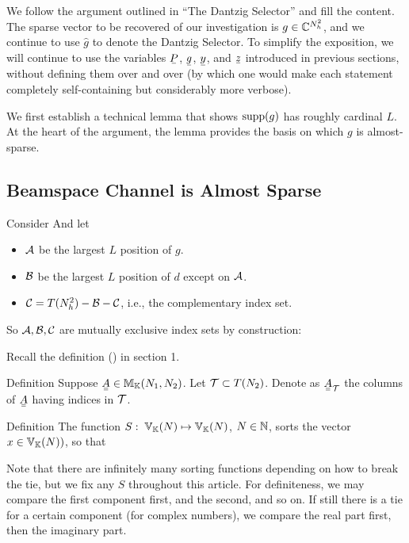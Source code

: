 
We follow the argument outlined in ``The Dantzig Selector'' and fill the content.
The sparse vector to be recovered of our investigation is \(g \in \mathbb{C}^{N_h^2}\), and we continue to use \(\hat{g}\) to denote the Dantzig Selector.
To simplify the exposition, we will continue to use the variables \(\V{P}\), \(\V{g}\), \(\V{y}\), and \(\V{z}\) introduced in previous sections, without defining them over and over (by which one would make each statement completely self-containing but considerably more verbose).

We first establish a technical lemma that shows \(\mathrm{supp}(g)\) has roughly cardinal \(L\).
At the heart of the argument, the lemma provides the basis on which \(g\) is almost-sparse.

\subsection{Beamspace Channel is Almost Sparse}

Consider
%
%
And let
\begin{itemize}
\item \(\mathcal{A}\) be the largest \(L\) position of \(g\).
\item \(\mathcal{B}\) be the largest \(L\) position of \(d\) except on \(\mathcal{A}\).
\item \(\mathcal{C} =T(N_h^2) -\mathcal{B} -\mathcal{C}\), i.e., the complementary index set.
\end{itemize}
So \(\mathcal{A}, \mathcal{B}, \mathcal{C}\) are mutually exclusive index sets by construction:
%


Recall the definition () in section 1.

\Result
{Definition}
{
Suppose \(\M{A} \in \MB{M}_{\MB{K}} (N_1, N_2)\).
Let \(\mathcal{T} \subset T (N_2)\).
Denote as \(\M{A}_{\MC{T}}\) the columns of \(\M{A}\) having indices in \(\mathcal{T}\).
}

\Result
{Definition}
{
The function \(S:\; \mathbb{V}_{\mathbb{K}}(N) \mapsto \mathbb{V}_{\mathbb{K}}(N)\), \(N \in \mathbb{N}\), sorts the vector \(x \in \mathbb{V}_{\mathbb{K}}(N))\), so that
}

Note that there are infinitely many sorting functions depending on how to break the tie, but we fix any \(S\) throughout this article.
For definiteness, we may compare the first component first, and the second, and so on.
If still there is a tie for a certain component (for complex numbers), we compare the real part first, then the imaginary part.


